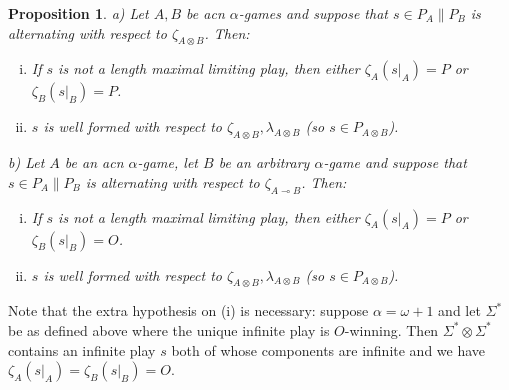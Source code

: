 \documentclass[11pt]{article} %
\theoremstyle{plain} %
\newtheorem{proposition}[theorem]{Proposition}
\theoremstyle{definition} %
\theoremstyle{note}
\theoremstyle{exercisestyle}
\newcommand{\tensor}{\otimes}
\renewcommand{\implies}{\multimap}
\newcommand{\st}{{\Sigma^*}}
\begin{document}
\begin{proposition}
  \label{NiceAcnGames}
  a) Let $A,B$ be acn $\alpha$-games and suppose that $s\in P_A\|P_B$ is alternating with respect to $\zeta_{A\tensor B}$.  Then:
  \begin{enumerate}[i)]
    \item If $s$ is not a length maximal limiting play, then either $\zeta_A(s\vert_A)=P$ or $\zeta_B(s\vert_B)=P$.  
    \item $s$ is well formed with respect to $\zeta_{A\tensor B},\lambda_{A\tensor B}$ (so $s\in P_{A\tensor B}$).
  \end{enumerate}

  b) Let $A$ be an acn $\alpha$-game, let $B$ be an arbitrary $\alpha$-game and suppose that $s\in P_A\|P_B$ is alternating with respect to $\zeta_{A\implies B}$.  Then:
  \begin{enumerate}[i)]
    \item If $s$ is not a length maximal limiting play, then either $\zeta_A(s\vert_A)=P$ or $\zeta_B(s\vert_B)=O$.
    \item $s$ is well formed with respect to $\zeta_{A\tensor B},\lambda_{A\tensor B}$ (so $s\in P_{A\tensor B}$).
  \end{enumerate}
\end{proposition}

Note that the extra hypothesis on (i) is necessary: suppose $\alpha=\omega+1$ and let $\st$ be as defined above where the unique infinite play is $O$-winning.  Then $\st\tensor\st$ contains an infinite play $s$ both of whose components are infinite and we have $\zeta_A(s\vert_A)=\zeta_B(s\vert_B)=O$.  
\end{document}
